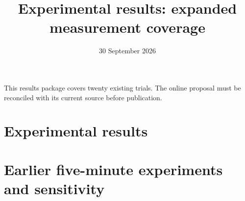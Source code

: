 \documentclass[11pt]{article}
\title{Experimental results: expanded measurement coverage}
\author{}
\date{30 September 2026}
\begin{document}
\maketitle
\noindent This results package covers twenty existing trials. The online proposal must be reconciled with its current source before publication.
\section{Experimental results}

\clearpage

\clearpage

\clearpage
\appendix
\section{Earlier five-minute experiments and sensitivity}

\clearpage


\end{document}

